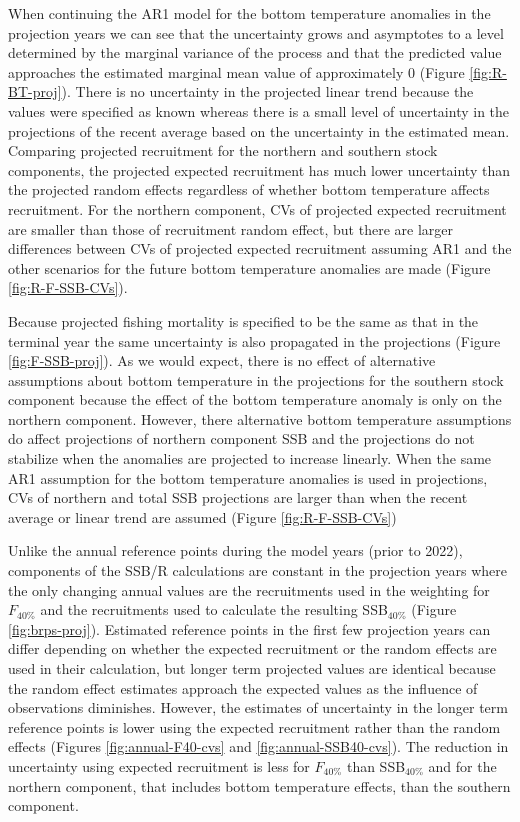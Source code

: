 \documentclass[
]{article}
\begin{document}
When continuing the AR1 model for the bottom temperature anomalies in
the projection years we can see that the uncertainty grows and
asymptotes to a level determined by the marginal variance of the process
and that the predicted value approaches the estimated marginal mean
value of approximately 0 (Figure \ref{fig:R-BT-proj}). There is no
uncertainty in the projected linear trend because the values were
specified as known whereas there is a small level of uncertainty in the
projections of the recent average based on the uncertainty in the
estimated mean. Comparing projected recruitment for the northern and
southern stock components, the projected expected recruitment has much
lower uncertainty than the projected random effects regardless of
whether bottom temperature affects recruitment. For the northern
component, CVs of projected expected recruitment are smaller than those
of recruitment random effect, but there are larger differences between
CVs of projected expected recruitment assuming AR1 and the other
scenarios for the future bottom temperature anomalies are made (Figure
\ref{fig:R-F-SSB-CVs}).

Because projected fishing mortality is specified to be the same as that
in the terminal year the same uncertainty is also propagated in the
projections (Figure \ref{fig:F-SSB-proj}). As we would expect, there is
no effect of alternative assumptions about bottom temperature in the
projections for the southern stock component because the effect of the
bottom temperature anomaly is only on the northern component. However,
there alternative bottom temperature assumptions do affect projections
of northern component SSB and the projections do not stabilize when the
anomalies are projected to increase linearly. When the same AR1
assumption for the bottom temperature anomalies is used in projections,
CVs of northern and total SSB projections are larger than when the
recent average or linear trend are assumed (Figure
\ref{fig:R-F-SSB-CVs})

Unlike the annual reference points during the model years (prior to
2022), components of the SSB/R calculations are constant in the
projection years where the only changing annual values are the
recruitments used in the weighting for \(F_{40\%}\) and the recruitments
used to calculate the resulting SSB\(_{40\%}\) (Figure
\ref{fig:brps-proj}). Estimated reference points in the first few
projection years can differ depending on whether the expected
recruitment or the random effects are used in their calculation, but
longer term projected values are identical because the random effect
estimates approach the expected values as the influence of observations
diminishes. However, the estimates of uncertainty in the longer term
reference points is lower using the expected recruitment rather than the
random effects (Figures \ref{fig:annual-F40-cvs} and
\ref{fig:annual-SSB40-cvs}). The reduction in uncertainty using expected
recruitment is less for \(F_{40\%}\) than SSB\(_{40\%}\) and for the
northern component, that includes bottom temperature effects, than the
southern component.
\end{document}

